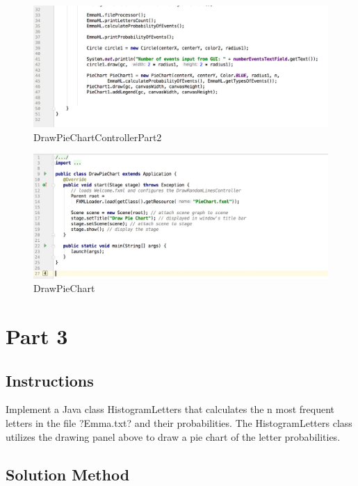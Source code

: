 \documentclass[a4paper,12pt]{article}
\begin{document}
\begin{figure}[H]
   \centering
   \includegraphics[width = 17cm]{DrawPieChartControllerPart2} %
   \caption{DrawPieChartControllerPart2}
   \label{DrawPieChartControllerPart2}
\end{figure}




\begin{figure}[H]
   \centering
   \includegraphics[width = 19cm]{DrawPieChart} %
   \caption{DrawPieChart}
   \label{DrawPieChartMain}
\end{figure}



\section{Part 3}

\subsection{Instructions}
 Implement a Java class HistogramLetters that calculates the n most frequent letters in the file ?Emma.txt? and their probabilities. The HistogramLetters class utilizes the drawing panel above to draw a pie chart of the letter probabilities.


\subsection{Solution Method}
\end{document}
